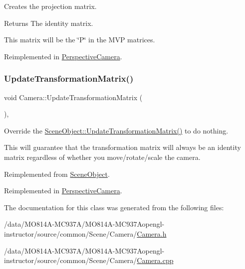 Creates the projection matrix.

\begin{DoxyReturn}{Returns}
The identity matrix.
\end{DoxyReturn}
This matrix will be the \char`\"{}\+P\char`\"{} in the M\+VP matrices.

Reimplemented in \hyperlink{class_perspective_camera_ab467388c7d3e4c2ef9b498c16f291545}{Perspective\+Camera}.

\hypertarget{class_camera_aea640c892a3807671d8ca49616d96eda}{}\label{class_camera_aea640c892a3807671d8ca49616d96eda}
\subsubsection{\texorpdfstring{Update\+Transformation\+Matrix()}{UpdateTransformationMatrix()}}
{\footnotesize\ttfamily void Camera\+::\+Update\+Transformation\+Matrix (\begin{DoxyParamCaption}{ }\end{DoxyParamCaption})\hspace{0.3cm}{\ttfamily [protected]}, {\ttfamily [virtual]}}



Override the \hyperlink{class_scene_object_a20e31da3f9d2765de50cdb2d637ae6c9}{Scene\+Object\+::\+Update\+Transformation\+Matrix()} to do nothing.

This will guarantee that the transformation matrix will always be an identity matrix regardless of whether you move/rotate/scale the camera.

Reimplemented from \hyperlink{class_scene_object_a20e31da3f9d2765de50cdb2d637ae6c9}{Scene\+Object}.



Reimplemented in \hyperlink{class_perspective_camera_a2f17fb07425e2146d5692805753fa368}{Perspective\+Camera}.



The documentation for this class was generated from the following files\+:\begin{DoxyCompactItemize}
\item
/data/MO814A-MC937A/MO814A-MC937Aopengl-\/instructor/source/common/\+Scene/\+Camera/\hyperlink{_camera_8h}{Camera.\+h}\item
/data/MO814A-MC937A/MO814A-MC937Aopengl-\/instructor/source/common/\+Scene/\+Camera/\hyperlink{_camera_8cpp}{Camera.\+cpp}\end{DoxyCompactItemize}
